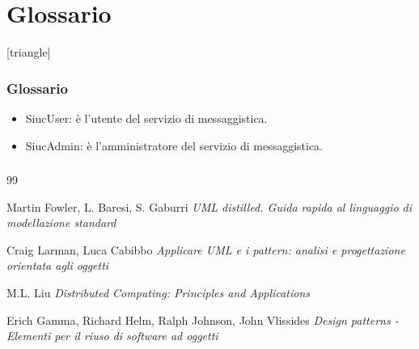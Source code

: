 \documentclass[t]{beamer} %
\let\olditem=\item%
\renewcommand{\item}{\olditem \justifying}%
\begin{document}
\section{Glossario}
[triangle]
\begin{frame}
  \frametitle{Glossario} 
   \begin{itemize} 
    \item SiucUser: è l'utente del servizio di messaggistica.
    \item SiucAdmin: è l'amministratore del servizio di messaggistica.
    
  \end{itemize}
\end{frame}

\begin {frame} 
 \frametitle {\refname}
  \begin {thebibliography}{99}
   {\tiny 
       Martin Fowler, L. Baresi, S. Gaburri 
     \newblock \emph{UML distilled. Guida rapida al linguaggio di modellazione standard} 

      Craig Larman, Luca Cabibbo
     \newblock \emph{Applicare UML e i pattern: analisi e progettazione orientata agli oggetti} 

      M.L. Liu
     \newblock \emph{Distributed Computing: Principles and Applications} 

      Erich Gamma, Richard Helm, Ralph Johnson, John Vlissides
     \newblock \emph{Design patterns - Elementi per il riuso di software ad oggetti} 
   }
   \end {thebibliography}
\end {frame}
\end{document}
